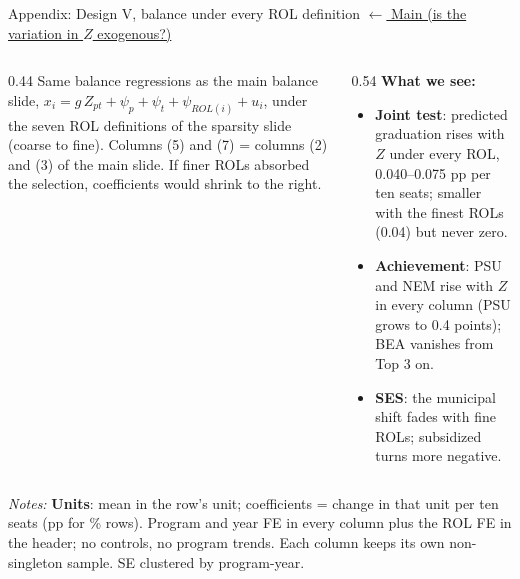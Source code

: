\documentclass{beamer}
\begin{document}
\begin{frame}[label=d5-app-balance-rol]{Appendix: Design V, balance under every ROL definition}
\vspace{-0.3cm}
\hyperlink{d5-balance}{\tiny\color{blue}$\leftarrow$ Main (is the variation in $Z$ exogenous?)}

\centering
\tiny
\resizebox{0.80\textwidth}{!}{}

\vspace{0.05cm}
\begin{columns}[T,onlytextwidth]
\begin{column}{0.44\textwidth}
\scriptsize
Same balance regressions as the main balance slide, $x_i = g\,Z_{pt} + \psi_p + \psi_t + \psi_{ROL(i)} + u_i$, under the seven ROL definitions of the sparsity slide (coarse to fine). Columns (5) and (7) = columns (2) and (3) of the main slide. If finer ROLs absorbed the selection, coefficients would shrink to the right.
\end{column}
\begin{column}{0.54\textwidth}
\scriptsize
\textbf{What we see:}
\begin{itemize}
    \setlength{\itemsep}{0pt}
    \item \textbf{Joint test}: predicted graduation rises with $Z$ under every ROL, 0.040--0.075 pp per ten seats; smaller with the finest ROLs (0.04) but never zero.
    \item \textbf{Achievement}: PSU and NEM rise with $Z$ in every column (PSU grows to 0.4 points); BEA vanishes from Top 3 on.
    \item \textbf{SES}: the municipal shift fades with fine ROLs; subsidized turns more negative.
\end{itemize}
\end{column}
\end{columns}

\vspace{0.05cm}
\parbox{0.97\textwidth}{\tiny \textit{Notes:} \textbf{Units}: mean in the row's unit; coefficients = change in that unit per ten seats (pp for \% rows). Program and year FE in every column plus the ROL FE in the header; no controls, no program trends. Each column keeps its own non-singleton sample. SE clustered by program-year.}
\end{frame}
\end{document}
